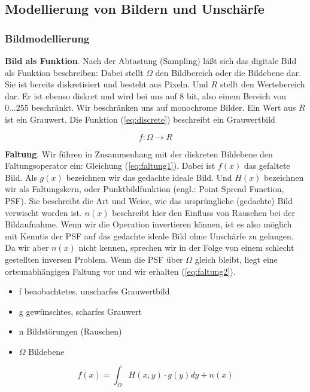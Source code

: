 \documentclass[a4paper,12pt]{article}
\begin{document}
\subsection{Modellierung von Bildern und Unschärfe}

\subsubsection{Bildmodellierung}
\textbf{Bild als Funktion}. Nach der Abtastung (Sampling) läßt sich das
digitale Bild als Funktion beschreiben:
Dabei stellt $\Omega$ den Bildbereich oder die Bildebene dar. Sie ist bereits
diskretisiert und besteht aus Pixeln. Und $R$ stellt den Wertebereich dar. Er
ist ebenso diskret und wird bei uns auf 8 bit, also einem Bereich von
$0\ldots255$ beschränkt. Wir beschränken uns auf monochrome Bilder. Ein Wert
aus $R$ ist ein Grauwert. Die Funktion (\ref{eq:discrete}) beschreibt ein
Grauwertbild

\begin{equation} \label{eq:discrete}
f: \Omega \to R
\end{equation}

\textbf{Faltung}. Wir führen in Zusammenhang mit der diskreten Bildebene den
Faltungsoperator ein: Gleichung (\ref{eq:faltung1}). Dabei ist $f(x)$ das
gefaltete Bild.
Als $g(x)$ bezeichnen wir das gedachte ideale Bild. Und $H(x)$ bezeichnen wir als Faltungskern,
 oder Punktbildfunktion
(engl.: Point Spread Function, PSF). Sie beschreibt die Art und Weise, wie das
ursprüngliche (gedachte) Bild verwischt worden ist. $n(x)$ beschreibt
hier den Einfluss von Rauschen bei der Bildaufnahme. Wenn wir die Operation invertieren können, ist es also möglich
mit Kenntis der PSF auf das gedachte ideale Bild ohne Unschärfe zu gelangen. Da
wir aber $n(x)$ nicht kennen, sprechen wir in der Folge von einem schlecht
gestellten inversen Problem.
Wenn die PSF über $\Omega$ gleich bleibt, liegt eine ortsunabhängigen Faltung
vor und wir erhalten (\ref{eq:faltung2}).

\begin{itemize}
  \itemsep -1pt
  \item f beaobachtetes, unscharfes Grauwertbild
  \item g gewünschtes, scharfes Grauwert
  \item n Bildstörungen (Rauschen)
  \item $\Omega$ Bildebene
\end{itemize}

\begin{equation} \label{eq:faltung1}
f(x)=\int_\Omega{H(x,y) \cdot g(y)dy+n(x)}
\end{equation}
\end{document}
